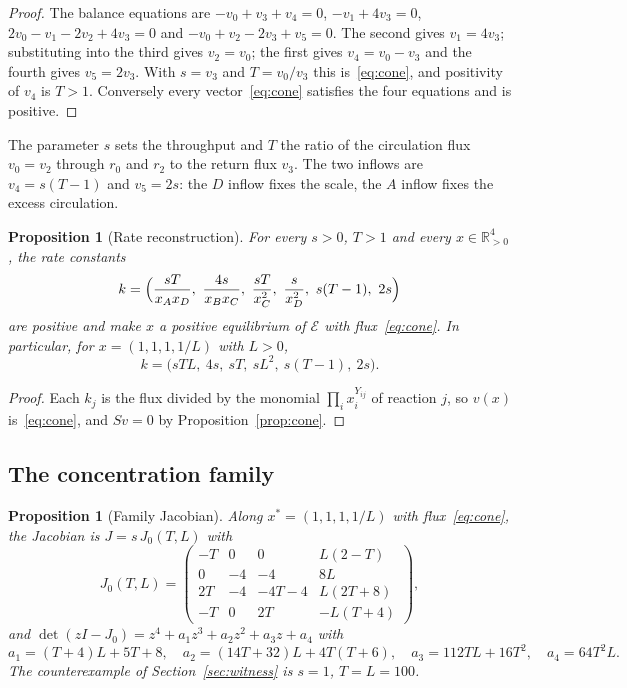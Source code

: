 \documentclass[11pt,a4paper]{article}
\theoremstyle{plain}
\newtheorem{proposition}[theorem]{Proposition}
\theoremstyle{definition}
\theoremstyle{remark}
\newcommand{\R}{\mathbb{R}}
\newcommand{\xs}{x^{*}}
\begin{document}
\begin{proof}
The balance equations are $-v_0+v_3+v_4=0$, $-v_1+4v_3=0$, $2v_0-v_1-2v_2+4v_3=0$ and $-v_0+v_2-2v_3+v_5=0$. The second gives $v_1=4v_3$; substituting into the third gives $v_2=v_0$; the first gives $v_4=v_0-v_3$ and the fourth gives $v_5=2v_3$. With $s=v_3$ and $T=v_0/v_3$ this is~\eqref{eq:cone}, and positivity of $v_4$ is $T>1$. Conversely every vector~\eqref{eq:cone} satisfies the four equations and is positive.
\end{proof}

The parameter $s$ sets the throughput and $T$ the ratio of the circulation flux $v_0=v_2$ through $r_0$ and $r_2$ to the return flux $v_3$. The two inflows are $v_4=s(T-1)$ and $v_5=2s$: the $D$ inflow fixes the scale, the $A$ inflow fixes the excess circulation.

\begin{proposition}[Rate reconstruction]\label{prop:reconstruct}
For every $s>0$, $T>1$ and every $x\in\R^4_{>0}$, the rate constants
\[
k=\Bigl(\frac{sT}{x_Ax_D},\ \frac{4s}{x_Bx_C},\ \frac{sT}{x_C^2},\ \frac{s}{x_D^2},\ s(T-1),\ 2s\Bigr)
\]
are positive and make $x$ a positive equilibrium of $\mathcal E$ with flux~\eqref{eq:cone}. In particular, for $x=(1,1,1,1/L)$ with $L>0$,
\begin{equation}\label{eq:kfamily}
k=\bigl(sTL,\ 4s,\ sT,\ sL^2,\ s(T-1),\ 2s\bigr).
\end{equation}
\end{proposition}

\begin{proof}
Each $k_j$ is the flux divided by the monomial $\prod_ix_i^{Y_{ij}}$ of reaction $j$, so $v(x)$ is~\eqref{eq:cone}, and $Sv=0$ by Proposition~\ref{prop:cone}.
\end{proof}

\subsection{The concentration family}

\begin{proposition}[Family Jacobian]\label{prop:family}
Along $\xs=(1,1,1,1/L)$ with flux~\eqref{eq:cone}, the Jacobian is $J=s\,J_0(T,L)$ with
\begin{equation}\label{eq:J0}
J_0(T,L)=\begin{pmatrix}
-T&0&0&L(2-T)\\
0&-4&-4&8L\\
2T&-4&-4T-4&L(2T+8)\\
-T&0&2T&-L(T+4)
\end{pmatrix},
\end{equation}
and $\det(zI-J_0)=z^4+a_1z^3+a_2z^2+a_3z+a_4$ with
\begin{equation}\label{eq:famcoeff}
a_1=(T+4)L+5T+8,\quad a_2=(14T+32)L+4T(T+6),\quad a_3=112TL+16T^2,\quad a_4=64T^2L .
\end{equation}
The counterexample of Section~\ref{sec:witness} is $s=1$, $T=L=100$.
\end{proposition}
\end{document}
